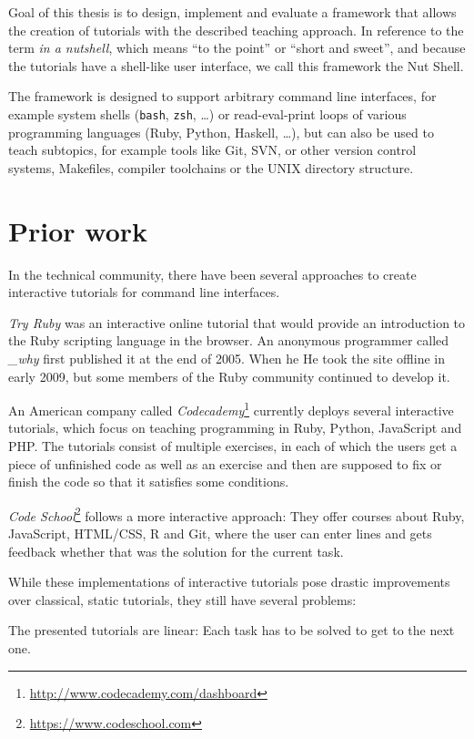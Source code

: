 \documentclass[paper=a4,twoside,abstract=on,cleardoublepage=empty,numbers=noenddot,toc=bib,12pt,appendixprefix=true]{scrreprt}
\begin{document}
Goal of this thesis is to design, implement and evaluate a framework that allows the creation of tutorials with the described teaching approach. In reference to the term \emph{in a nutshell}, which means “to the point” or “short and sweet”, and because the tutorials have a shell-like user interface, we call this framework the Nut Shell.

The framework is designed to support arbitrary command line interfaces, for example system shells (\texttt{bash}, \texttt{zsh}, …) or read-eval-print loops of various programming languages (Ruby, Python, Haskell, …), but can also be used to teach subtopics, for example tools like Git, SVN, or other version control systems, Makefiles, compiler toolchains or the UNIX directory structure.

\section{Prior work}

In the technical community, there have been several approaches to create interactive tutorials for command line interfaces.

\emph{Try Ruby} was an interactive online tutorial that would provide an introduction to the Ruby scripting language in the browser. An anonymous programmer called \emph{\_why} first published it at the end of 2005.\cite{tryrubydone} When he He took the site offline in early 2009, but some members of the Ruby community continued to develop it.

An American company called \emph{Codecademy}\footnote{\url{http://www.codecademy.com/dashboard}} currently deploys several interactive tutorials, which focus on teaching programming in Ruby, Python, JavaScript and PHP. The tutorials consist of multiple exercises, in each of which the users get a piece of unfinished code as well as an exercise and then are supposed to fix or finish the code so that it satisfies some conditions.

\emph{Code School}\footnote{\url{https://www.codeschool.com}} follows a more interactive approach: They offer courses about Ruby, JavaScript, HTML/CSS, R and Git, where the user can enter lines and gets feedback whether that was the solution for the current task.

While these implementations of interactive tutorials pose drastic improvements over classical, static tutorials, they still have several problems:

The presented tutorials are linear: Each task has to be solved to get to the next one.
\end{document}
